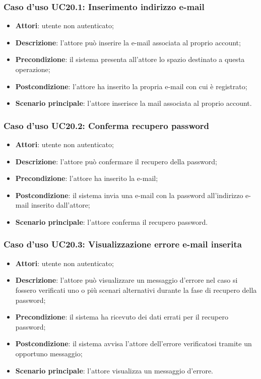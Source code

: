 \subsubsection{Caso d'uso UC20.1: Inserimento indirizzo e-mail}
\begin{itemize}
	\item \textbf{Attori}: utente non autenticato;
	\item \textbf{Descrizione}: l'attore può inserire la e-mail associata al proprio account;
	\item \textbf{Precondizione}: il sistema presenta all'attore lo spazio destinato a questa operazione;
	\item \textbf{Postcondizione}: l'attore ha inserito la propria e-mail con cui è registrato;
	\item \textbf{Scenario principale}: l'attore inserisce la mail associata al proprio account. 
\end{itemize}

\subsubsection{Caso d'uso UC20.2: Conferma recupero password}
\begin{itemize}
	\item \textbf{Attori}: utente non autenticato;
	\item \textbf{Descrizione}: l'attore può confermare il recupero della password;
	\item \textbf{Precondizione}: l'attore ha inserito la e-mail;
	\item \textbf{Postcondizione}: il sistema invia una e-mail con la password all'indirizzo e-mail inserito dall'attore;
	\item \textbf{Scenario principale}: l'attore conferma il recupero password.
\end{itemize}

\subsubsection{Caso d'uso UC20.3: Visualizzazione errore e-mail inserita}
\begin{itemize}
	\item \textbf{Attori}: utente non autenticato;
	\item \textbf{Descrizione}: l'attore può visualizzare un messaggio d'errore nel caso si fossero verificati uno o più scenari alternativi durante la fase di recupero della password;
	\item \textbf{Precondizione}: il sistema ha ricevuto dei dati errati per il recupero password;
	\item \textbf{Postcondizione}: il sistema avvisa l'attore dell'errore verificatosi tramite un opportuno messaggio;
	\item \textbf{Scenario principale}: l'attore visualizza un messaggio d'errore.
\end{itemize}